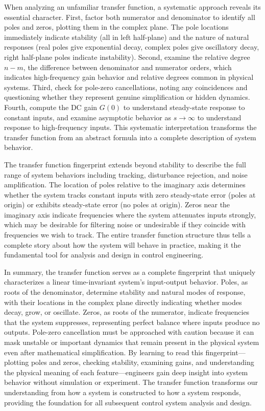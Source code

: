 When analyzing an unfamiliar transfer function, a systematic approach reveals its essential character. First, factor both numerator and denominator to identify all poles and zeros, plotting them in the complex plane. The pole locations immediately indicate stability (all in left half-plane) and the nature of natural responses (real poles give exponential decay, complex poles give oscillatory decay, right half-plane poles indicate instability). Second, examine the relative degree $n-m$, the difference between denominator and numerator orders, which indicates high-frequency gain behavior and relative degrees common in physical systems. Third, check for pole-zero cancellations, noting any coincidences and questioning whether they represent genuine simplification or hidden dynamics. Fourth, compute the DC gain $G(0)$ to understand steady-state response to constant inputs, and examine asymptotic behavior as $s \to \infty$ to understand response to high-frequency inputs. This systematic interpretation transforms the transfer function from an abstract formula into a complete description of system behavior.

The transfer function fingerprint extends beyond stability to describe the full range of system behaviors including tracking, disturbance rejection, and noise amplification. The location of poles relative to the imaginary axis determines whether the system tracks constant inputs with zero steady-state error (poles at origin) or exhibits steady-state error (no poles at origin). Zeros near the imaginary axis indicate frequencies where the system attenuates inputs strongly, which may be desirable for filtering noise or undesirable if they coincide with frequencies we wish to track. The entire transfer function structure thus tells a complete story about how the system will behave in practice, making it the fundamental tool for analysis and design in control engineering.

In summary, the transfer function serves as a complete fingerprint that uniquely characterizes a linear time-invariant system's input-output behavior. Poles, as roots of the denominator, determine stability and natural modes of response, with their locations in the complex plane directly indicating whether modes decay, grow, or oscillate. Zeros, as roots of the numerator, indicate frequencies that the system suppresses, representing perfect balance where inputs produce no outputs. Pole-zero cancellation must be approached with caution because it can mask unstable or important dynamics that remain present in the physical system even after mathematical simplification. By learning to read this fingerprint—plotting poles and zeros, checking stability, examining gains, and understanding the physical meaning of each feature—engineers gain deep insight into system behavior without simulation or experiment. The transfer function transforms our understanding from how a system is constructed to how a system responds, providing the foundation for all subsequent control system analysis and design.

